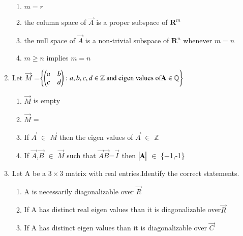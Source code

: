 \begin{enumerate}[label=\thesection.\arabic*.,ref=\thesection.\theenumi]
\begin{enumerate}
		\item $m=r$
		\item the column space of $\vec{A}$ is a proper subspace of $\mathbf{R}^{m}$ 
		\item the null space of $\vec{A}$ is a non-trivial subspace of $\mathbf{R}^{n}$ whenever $m=n$
		\item $m\geq n$ implies $m=n$
	\end{enumerate}
%
\solution

\item Let $\vec{M}$ =$\left\{\begin{pmatrix}a&b\\c&d\end{pmatrix} : a,b,c,d \in \mathbb{Z} \text{ and eigen values of} \mathbf{A} \in \mathbb{Q}\right\}$ \label{main}
\begin{enumerate}
    \item $\vec{M}$ is empty
    \item $\vec{M}$ =
    \item If $\vec{A}$ $\in$ $\vec{M}$ then the eigen values of $\vec{A}$ $\in$ $\mathbb{Z}$
    \item If $\vec{A}$,$\vec{B}$ $\in$ $\vec{M}$ such that $\vec{A} \vec{B}$=$\vec{I}$ then $\begin{vmatrix}\mathbf{A}\end{vmatrix}$ $\in$ \{+1,-1\}
\end{enumerate}
%
\solution

%
\item Let A be a $3\times 3$  matrix  with real entries.Identify  the correct statements.
\begin{enumerate}

\item A  is necessarily diagonalizable over $\vec{R}$

\item If A has distinct real  eigen values than  it is diagonalizable over$\vec{R}$

\item If A has distinct eigen values than  it is diagonalizable over $\vec{C}$


\end{enumerate}
\end{enumerate}
